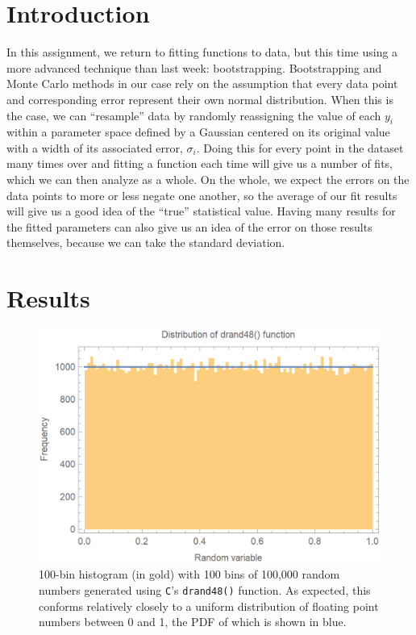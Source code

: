 \documentclass{article}
\author{\hwauthor}
\title{\hwtitle}
\date{\hwdate}
\begin{document}
\maketitle
\thispagestyle{fancy}

\section{Introduction}

In this assignment, we return to fitting functions to data, but this time using a more advanced technique than last week: bootstrapping. Bootstrapping and Monte Carlo methods in our case rely on the assumption that every data point and corresponding error represent their own normal distribution. When this is the case, we can ``resample'' data by randomly reassigning the value of each $y_i$ within a parameter space defined by a Gaussian centered on its original value with a width of its associated error, $\sigma_i$. Doing this for every point in the dataset many times over and fitting a function each time will give us a number of fits, which we can then analyze as a whole. On the whole, we expect the errors on the data points to more or less negate one another, so the average of our fit results will give us a good idea of the ``true'' statistical value. Having many results for the fitted parameters can also give us an idea of the error on those results themselves, because we can take the standard deviation.

\newpage

\section{Results}

\bigskip
{}
\medskip

\begin{figure}[H]
    \centering
    \includegraphics[width=4.4in]{homework7/uniform_dist.png}
    \caption{100-bin histogram (in gold) with 100 bins of 100,000 random numbers generated using \texttt{C}'s \texttt{drand48()} function. As expected, this conforms relatively closely to a uniform distribution of floating point numbers between 0 and 1, the PDF of which is shown in blue.}
    \label{fig:drand48}
\end{figure}
\end{document}
